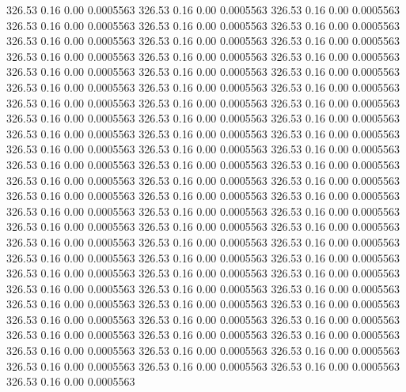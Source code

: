  326.53    0.16    0.00   0.0005563
 326.53    0.16    0.00   0.0005563
 326.53    0.16    0.00   0.0005563
 326.53    0.16    0.00   0.0005563
 326.53    0.16    0.00   0.0005563
 326.53    0.16    0.00   0.0005563
 326.53    0.16    0.00   0.0005563
 326.53    0.16    0.00   0.0005563
 326.53    0.16    0.00   0.0005563
 326.53    0.16    0.00   0.0005563
 326.53    0.16    0.00   0.0005563
 326.53    0.16    0.00   0.0005563
 326.53    0.16    0.00   0.0005563
 326.53    0.16    0.00   0.0005563
 326.53    0.16    0.00   0.0005563
 326.53    0.16    0.00   0.0005563
 326.53    0.16    0.00   0.0005563
 326.53    0.16    0.00   0.0005563
 326.53    0.16    0.00   0.0005563
 326.53    0.16    0.00   0.0005563
 326.53    0.16    0.00   0.0005563
 326.53    0.16    0.00   0.0005563
 326.53    0.16    0.00   0.0005563
 326.53    0.16    0.00   0.0005563
 326.53    0.16    0.00   0.0005563
 326.53    0.16    0.00   0.0005563
 326.53    0.16    0.00   0.0005563
 326.53    0.16    0.00   0.0005563
 326.53    0.16    0.00   0.0005563
 326.53    0.16    0.00   0.0005563
 326.53    0.16    0.00   0.0005563
 326.53    0.16    0.00   0.0005563
 326.53    0.16    0.00   0.0005563
 326.53    0.16    0.00   0.0005563
 326.53    0.16    0.00   0.0005563
 326.53    0.16    0.00   0.0005563
 326.53    0.16    0.00   0.0005563
 326.53    0.16    0.00   0.0005563
 326.53    0.16    0.00   0.0005563
 326.53    0.16    0.00   0.0005563
 326.53    0.16    0.00   0.0005563
 326.53    0.16    0.00   0.0005563
 326.53    0.16    0.00   0.0005563
 326.53    0.16    0.00   0.0005563
 326.53    0.16    0.00   0.0005563
 326.53    0.16    0.00   0.0005563
 326.53    0.16    0.00   0.0005563
 326.53    0.16    0.00   0.0005563
 326.53    0.16    0.00   0.0005563
 326.53    0.16    0.00   0.0005563
 326.53    0.16    0.00   0.0005563
 326.53    0.16    0.00   0.0005563
 326.53    0.16    0.00   0.0005563
 326.53    0.16    0.00   0.0005563
 326.53    0.16    0.00   0.0005563
 326.53    0.16    0.00   0.0005563
 326.53    0.16    0.00   0.0005563
 326.53    0.16    0.00   0.0005563
 326.53    0.16    0.00   0.0005563
 326.53    0.16    0.00   0.0005563
 326.53    0.16    0.00   0.0005563
 326.53    0.16    0.00   0.0005563
 326.53    0.16    0.00   0.0005563
 326.53    0.16    0.00   0.0005563
 326.53    0.16    0.00   0.0005563
 326.53    0.16    0.00   0.0005563
 326.53    0.16    0.00   0.0005563
 326.53    0.16    0.00   0.0005563
 326.53    0.16    0.00   0.0005563
 326.53    0.16    0.00   0.0005563
 326.53    0.16    0.00   0.0005563
 326.53    0.16    0.00   0.0005563
 326.53    0.16    0.00   0.0005563

